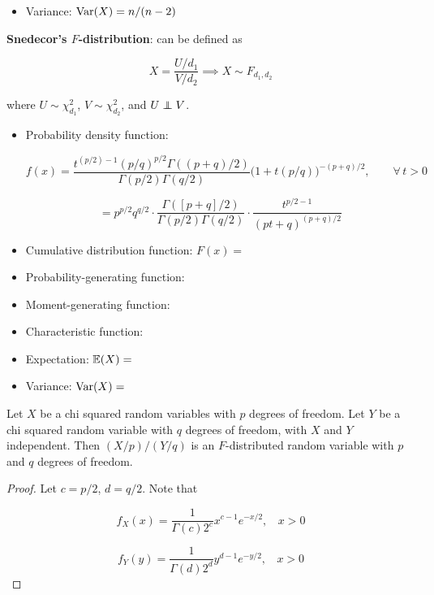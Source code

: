 \begin{itemize}
\begin{itemize}
\item Variance: \(\mathrm{Var}(X) = n/(n-2)\)

\end{itemize}

\textbf{Snedecor's \(F\)-distribution}: can be defined as

\[
X = \frac{U/d_1}{V/d_2} \implies X \sim F_{d_1, d_2}
\]

where \(U \sim \chi_{d_1}^2\), \(V \sim \chi_{d_2}^2\), and \(U \indep V\).

\begin{itemize}

\item Probability density function: 

\[
f(x) =  \frac{t^{(p/2)-1}(p/q)^{p/2}\Gamma((p+q)/2)}{\Gamma(p/2)\Gamma(q/2)}\Big(1+t(p/q)\Big)^{-(p+q)/2},\qquad\forall\,t>0
\]

\[
= p^{p/2} q^{q/2}  \cdot  \frac{\Gamma([p+q]/2)  }{\Gamma(p/2)\Gamma(q/2) } \cdot  \frac{t^{p/2-1} }{  (pt+q)^{(p+q)/2} }
\]

\item Cumulative distribution function: \(F(x) =\)

\item Probability-generating function:

\item Moment-generating function:

\item Characteristic function:

\item Expectation: \(\mathbb{E}(X) = \)

\item Variance: \(\mathrm{Var}(X) = \)

\end{itemize}

\begin{proposition} Let $X$ be a chi squared random variables with $p$ degrees of freedom. Let $Y$ be a chi squared random variable with $q$ degrees of freedom, with $X$ and $Y$ independent. Then $(X/p)/(Y/q)$ is an \(F\)-distributed random variable with $p$ and $q$ degrees of freedom. \end{proposition}

\begin{proof}

Let \(c = p/2\), \(d = q/2\). Note that

\[
f_X(x) = \frac{1}{\Gamma(c)2^c}x^{c-1}e^{-x/2}, \ \ \ \ x > 0
\]

\[
f_Y(y) = \frac{1}{\Gamma(d)2^d}y^{d-1}e^{-y/2}, \ \ \ \ x > 0
\]


\end{proof}
\end{itemize}
